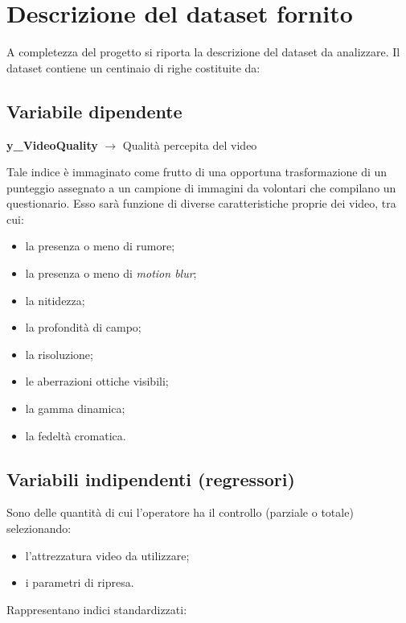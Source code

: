 \section{Descrizione del dataset fornito}
A completezza del progetto si riporta la descrizione del dataset da analizzare. Il dataset contiene un centinaio di righe costituite da:

\subsection*{Variabile dipendente}
\textbf{y\_VideoQuality} \quad $\rightarrow$ \quad Qualità percepita del video

Tale indice è immaginato come frutto di una opportuna trasformazione di un punteggio assegnato a un campione di immagini da volontari che compilano un questionario. Esso sarà funzione di diverse caratteristiche proprie dei video, tra cui:

\begin{itemize}
	\item la presenza o meno di rumore;
	\item la presenza o meno di \textit{motion blur};
	\item la nitidezza;
	\item la profondità di campo;
	\item la risoluzione;
	\item le aberrazioni ottiche visibili;
	\item la gamma dinamica;
	\item la fedeltà cromatica.
\end{itemize}

\subsection*{Variabili indipendenti (regressori)}

Sono delle quantità di cui l’operatore ha il controllo (parziale o totale) selezionando:

\begin{itemize}
	\item l’attrezzatura video da utilizzare;
	\item i parametri di ripresa.
\end{itemize}

Rappresentano indici standardizzati:


